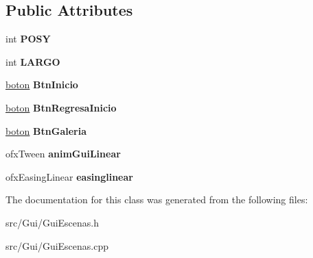 \subsection*{Public Attributes}
\begin{DoxyCompactItemize}
\item 
\hypertarget{class_gui_escenas_a416d88679780fb8dda0579328caef2ab}{}int {\bfseries P\+O\+S\+Y}\label{class_gui_escenas_a416d88679780fb8dda0579328caef2ab}

\item 
\hypertarget{class_gui_escenas_ab925eac264f45736d0b0f9eb7504476b}{}int {\bfseries L\+A\+R\+G\+O}\label{class_gui_escenas_ab925eac264f45736d0b0f9eb7504476b}

\item 
\hypertarget{class_gui_escenas_a7434dd4db388cb6454708ae173ca782c}{}\hyperlink{classboton}{boton} {\bfseries Btn\+Inicio}\label{class_gui_escenas_a7434dd4db388cb6454708ae173ca782c}

\item 
\hypertarget{class_gui_escenas_a4ae3283248bdf3bd61a9dc47eb2363e7}{}\hyperlink{classboton}{boton} {\bfseries Btn\+Regresa\+Inicio}\label{class_gui_escenas_a4ae3283248bdf3bd61a9dc47eb2363e7}

\item 
\hypertarget{class_gui_escenas_a09f40212386cd9f1803e647d5e8eafe3}{}\hyperlink{classboton}{boton} {\bfseries Btn\+Galeria}\label{class_gui_escenas_a09f40212386cd9f1803e647d5e8eafe3}

\item 
\hypertarget{class_gui_escenas_aea16763d4fb86b1dc406aabbd6417f1a}{}ofx\+Tween {\bfseries anim\+Gui\+Linear}\label{class_gui_escenas_aea16763d4fb86b1dc406aabbd6417f1a}

\item 
\hypertarget{class_gui_escenas_a3f91bca47c4763f172f0e140622dae7f}{}ofx\+Easing\+Linear {\bfseries easinglinear}\label{class_gui_escenas_a3f91bca47c4763f172f0e140622dae7f}

\end{DoxyCompactItemize}


The documentation for this class was generated from the following files\+:\begin{DoxyCompactItemize}
\item 
src/\+Gui/Gui\+Escenas.\+h\item 
src/\+Gui/Gui\+Escenas.\+cpp\end{DoxyCompactItemize}
